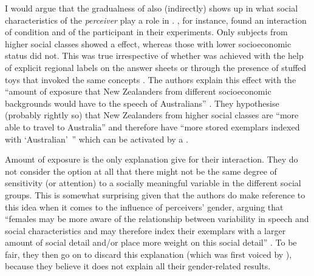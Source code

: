 I would argue that the gradualness of  also (indirectly) shows up in what social characteristics of the \emph{perceiver} play a role in .
\textcite{hayetal2006a,haydrager2010}, for instance, found an interaction of  condition and  of the participant in their experiments.
Only subjects from higher social classes showed a  effect, whereas those with lower socioeconomic status did not.
This was true irrespective of whether  was achieved with the help of explicit regional labels on the answer sheets or through the presence of stuffed toys that invoked the same concepts \parencite[cf.][878]{haydrager2010}.
The authors explain this effect with the ``amount of exposure  that New Zealanders from different socioeconomic backgrounds would have to the speech of Australians'' \parencite[878]{haydrager2010}.
They hypothesise (probably rightly so) that New Zealanders from higher social classes are ``more able to travel to Australia'' and therefore have ``more stored exemplars indexed with `Australian'~'' which can be activated by a .

Amount of exposure is the only explanation \citeauthor{haydrager2010} give for their  interaction.
They do not consider the option at all that there might not be the same degree of sensitivity (or attention) to a socially meaningful variable in the different social groups.
This is somewhat surprising given that the authors do make reference to this idea when it comes to the influence of perceivers' gender, arguing that ``females may be more aware of the relationship between variability in speech and social characteristics and may therefore index their exemplars with a larger amount of social detail and/or place more weight on this social detail'' \parencite[884]{haydrager2010}.
To be fair, they then go on to discard this explanation (which was first voiced by \cite{drager2005}), because they believe it does not explain all their gender-related results.

